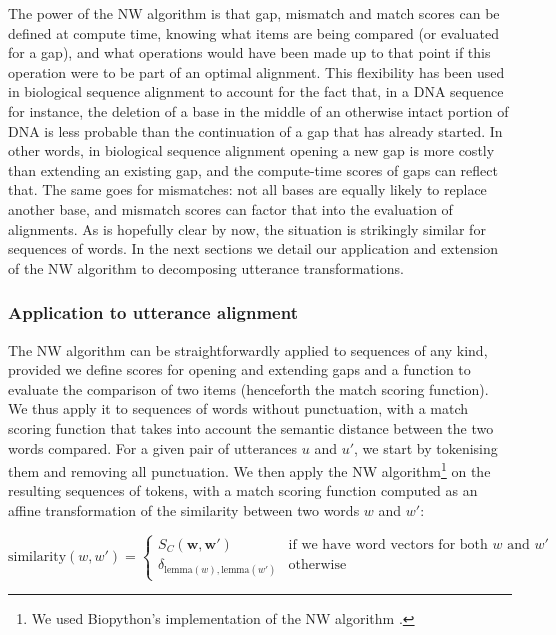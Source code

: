 \documentclass[a4paper,fleqn]{cas-dc}
\begin{document}
The power of the NW algorithm is that gap, mismatch and match scores can
be defined at compute time, knowing what items are being compared (or
evaluated for a gap), and what operations would have been made up to
that point if this operation were to be part of an optimal alignment.
This flexibility has been used in biological sequence alignment to
account for the fact that, in a DNA sequence for instance, the deletion
of a base in the middle of an otherwise intact portion of DNA is less
probable than the continuation of a gap that has already started. In
other words, in biological sequence alignment opening a new gap is more
costly than extending an existing gap, and the compute-time scores of
gaps can reflect that. The same goes for mismatches: not all bases are
equally likely to replace another base, and mismatch scores can factor
that into the evaluation of alignments. As is hopefully clear by now,
the situation is strikingly similar for sequences of words. In the next
sections we detail our application and extension of the NW algorithm to
decomposing utterance transformations.

\subsubsection{Application to utterance
alignment}\label{application-to-utterance-alignment}

The NW algorithm can be straightforwardly applied to sequences of any
kind, provided we define scores for opening and extending gaps and a
function to evaluate the comparison of two items (henceforth the match
scoring function). We thus apply it to sequences of words without
punctuation, with a match scoring function that takes into account the
semantic distance between the two words compared. For a given pair of
utterances \(u\) and \(u'\), we start by tokenising them and removing
all punctuation. We then apply the NW algorithm\footnote{We used
  Biopython's implementation of the NW algorithm
  \citep{cock_biopython:_2009}.} on the resulting sequences of
tokens, with a match scoring function computed as an affine
transformation of the similarity between two words \(w\) and \(w'\):

\[
\text{similarity}(w, w') = \begin{cases}
  S_C \left( \bm{w}, \bm{w}' \right) & \text{if we have word vectors for both $w$ and $w'$} \\
  \delta_{\text{lemma}(w), \text{lemma}(w')} & \text{otherwise}
\end{cases}
\]
\end{document}
